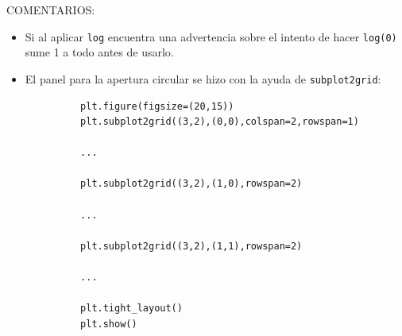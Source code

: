 \documentclass[11pt,letterpaper]{exam}
\begin{document}
\begin{questions}
\end{questions}

\newpage
COMENTARIOS:

\begin{itemize}
	\item Si al aplicar \verb+log+ encuentra una advertencia sobre el intento de hacer \verb+log(0)+ sume 1 a todo antes de usarlo.
	\item El panel para la apertura circular se hizo con la ayuda de \verb+subplot2grid+:
\end{itemize}

\begin{verbatim}
             plt.figure(figsize=(20,15))
             plt.subplot2grid((3,2),(0,0),colspan=2,rowspan=1)
             
             ...
             
             plt.subplot2grid((3,2),(1,0),rowspan=2)
             
             ...
             
             plt.subplot2grid((3,2),(1,1),rowspan=2)
             
             ...
             
             plt.tight_layout()
             plt.show()
\end{verbatim}
\end{document}
